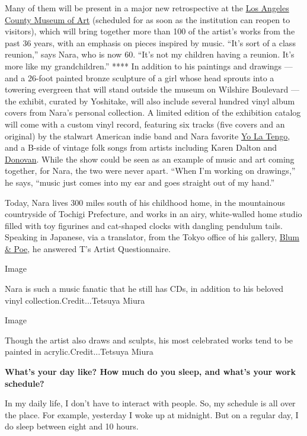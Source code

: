 Many of them will be present in a major new retrospective at the
\href{https://www.lacma.org/art/exhibition/yoshitomo-nara}{Los Angeles
County Museum of Art} (scheduled for as soon as the institution can
reopen to visitors), which will bring together more than 100 of the
artist's works from the past 36 years, with an emphasis on pieces
inspired by music. ``It's sort of a class reunion,'' says Nara, who is
now 60. ``It's not my children having a reunion. It's more like my
grandchildren.'' **** In addition to his paintings and drawings --- and
a 26-foot painted bronze sculpture of a girl whose head sprouts into a
towering evergreen that will stand outside the museum on Wilshire
Boulevard --- the exhibit, curated by Yoshitake, will also include
several hundred vinyl album covers from Nara's personal collection. A
limited edition of the exhibition catalog will come with a custom vinyl
record, featuring six tracks (five covers and an original) by the
stalwart American indie band and Nara favorite
\href{https://www.nytimes3xbfgragh.onion/2015/08/25/t-magazine/yo-la-tengo-ira-kaplan-inspirations.html}{Yo
La Tengo}, and a B-side of vintage folk songs from artists including
Karen Dalton and
\href{https://www.nytimes3xbfgragh.onion/2014/06/11/arts/music/donovan-to-enter-songwriters-hall-of-fame.html}{Donovan}.
While the show could be seen as an example of music and art coming
together, for Nara, the two were never apart. ``When I'm working on
drawings,'' he says, ``music just comes into my ear and goes straight
out of my hand.''

Today, Nara lives 300 miles south of his childhood home, in the
mountainous countryside of Tochigi Prefecture, and works in an airy,
white-walled home studio filled with toy figurines and cat-shaped clocks
with dangling pendulum tails. Speaking in Japanese, via a translator,
from the Tokyo office of his gallery,
\href{https://www.blumandpoe.com/}{Blum \& Poe}, he answered T's Artist
Questionnaire.

Image

Nara is such a music fanatic that he still has CDs, in addition to his
beloved vinyl collection.Credit...Tetsuya Miura

Image

Though the artist also draws and sculpts, his most celebrated works tend
to be painted in acrylic.Credit...Tetsuya Miura

\textbf{What's your day like? How much do you sleep, and what's your
work schedule?}

In my daily life, I don't have to interact with people. So, my schedule
is all over the place. For example, yesterday I woke up at midnight. But
on a regular day, I do sleep between eight and 10 hours.

